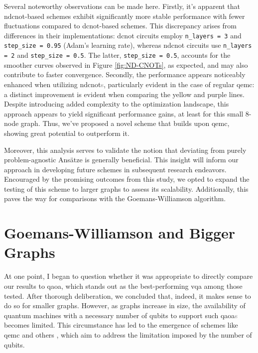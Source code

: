 Several noteworthy observations can be made here. Firstly, it's apparent that \acrshort{ndcnot}-based schemes exhibit significantly more stable performance with fewer fluctuations compared to \acrshort{dcnot}-based schemes. This discrepancy arises from differences in their implementations: \acrshort{dcnot} circuits employ \texttt{n\_layers = 3} and \texttt{step\_size = 0.95} (Adam's learning rate), whereas \acrshort{ndcnot} circuits use \texttt{n\_layers = 2} and \texttt{step\_size = 0.5}. The latter, \texttt{step\_size = 0.5}, accounts for the smoother curves observed in Figure \ref{fig:ND-CNOTs}, as expected, and may also contribute to faster convergence. Secondly, the performance appears noticeably enhanced when utilizing \acrshort{ndcnot}\textcolor{gray}{s}, particularly evident in the case of regular \acrshort{qemc}: a distinct improvement is evident when comparing the yellow and purple lines. Despite introducing added complexity to the optimization landscape, this approach appears to yield significant performance gains, at least for this small $8$-node graph. Thus, we've proposed a novel scheme that builds upon \acrshort{qemc}, showing great potential to outperform it.

Moreover, this analysis serves to validate the notion that deviating from purely problem-agnostic Ansätze is generally beneficial. This insight will inform our approach in developing future schemes in subsequent research endeavors. Encouraged by the promising outcomes from this study, we opted to expand the testing of this scheme to larger graphs to assess its scalability. Additionally, this paves the way for comparisons with the Goemans-Williamson algorithm.





\vspace{-2.5mm}
\section{Goemans-Williamson and Bigger Graphs}
\label{section:GW_Bigger_Graphs}


At one point, I began to question whether it was appropriate to directly compare our results to \acrshort{qaoa}, which stands out as the best-performing \acrshort{vqa} among those tested. After thorough deliberation, we concluded that, indeed, it makes sense to do so for smaller graphs. However, as graphs increase in size, the availability of quantum machines with a necessary number of qubits to support such \acrshort{qaoa}\textcolor{gray}{s} becomes limited. This circumstance has led to the emergence of schemes like \acrshort{qemc} \cite{tenecohen2023variational} and others \cite{sciorilli2024largescale}, which aim to address the limitation imposed by the number of qubits.

